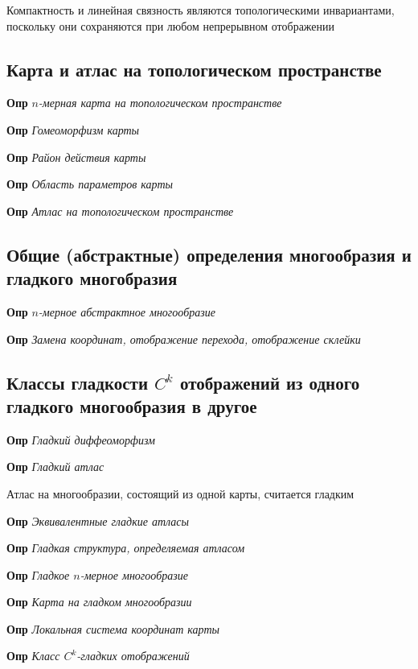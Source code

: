 \documentclass[a4paper, 14pt]{article}
\begin{document}
    Компактность и линейная связность являются топологическими инвариантами, поскольку они сохраняются при любом
    непрерывном отображении
    
    \subsection{Карта и атлас на топологическом пространстве}
    
    \textbf{Опр} \textit{$n$-мерная карта на топологическом пространстве}
    
    \textbf{Опр} \textit{Гомеоморфизм карты}
    
    \textbf{Опр} \textit{Район действия карты}
    
    \textbf{Опр} \textit{Область параметров карты}
    
    \textbf{Опр} \textit{Атлас на топологическом пространстве}
    
    \subsection{Общие (абстрактные) определения многообразия и гладкого многобразия}
    
    \textbf{Опр} \textit{$n$-мерное абстрактное многообразие}
    
    \textbf{Опр} \textit{Замена координат, отображение перехода, отображение склейки}
    
    \subsection{Классы гладкости $C^k$ отображений из одного гладкого многообразия в другое}
    
    \textbf{Опр} \textit{Гладкий диффеоморфизм}
    
    \textbf{Опр} \textit{Гладкий атлас}
    
    Атлас на многообразии, состоящий из одной карты, считается гладким
    
    \textbf{Опр} \textit{Эквивалентные гладкие атласы}
    
    \textbf{Опр} \textit{Гладкая структура, определяемая атласом}
    
    \textbf{Опр} \textit{Гладкое $n$-мерное многообразие}
    
    \textbf{Опр} \textit{Карта на гладком многообразии}
    
    \textbf{Опр} \textit{Локальная система координат карты}
    
    \textbf{Опр} \textit{Класс $C^k$-гладких отображений}
    
\end{document}

